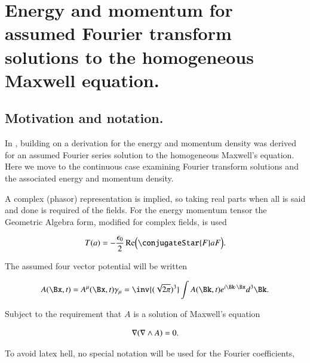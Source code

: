 

\chapter{Energy and momentum for assumed Fourier transform solutions to the homogeneous Maxwell equation.}
\label{chap:ftMaxVacuum}
\date{Dec 21, 2009}

\beginArtNoToc

\section{Motivation and notation.}

In , building on \cite{complexFieldEnergy} a derivation for the energy and momentum density was derived for an assumed Fourier series solution to the homogeneous Maxwell's equation.  Here we move to the continuous case examining Fourier transform solutions and the associated energy and momentum density.

A complex (phasor) representation is implied, so taking real parts when all is said and done is required of the fields.  For the energy momentum tensor the Geometric Algebra form, modified for complex fields, is used

\begin{align}
\label{eqn:ftMaxVacuum:1}
T(a) = -\frac{\epsilon_0}{2} \Real \Bigl( \conjugateStar{F} a F \Bigr).
\end{align}

The assumed four vector potential will be written

\begin{align}
\label{eqn:ftMaxVacuum:2}
A(\Bx, t) = A^\mu(\Bx, t) \gamma_\mu = \inv{(\sqrt{2 \pi})^3} \int A(\Bk, t) e^{i \Bk \cdot \Bx } d^3 \Bk.
\end{align}

Subject to the requirement that $A$ is a solution of Maxwell's equation

\begin{align}
\label{eqn:ftMaxVacuum:3}
\nabla (\nabla \wedge A) = 0.
\end{align}

To avoid latex hell, no special notation will be used for the Fourier coefficients,

